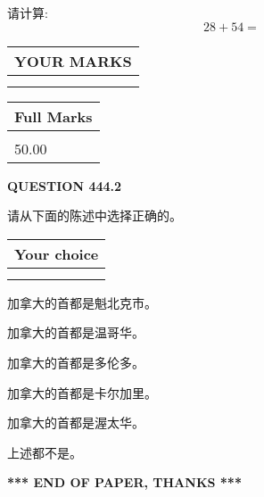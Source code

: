 \documentclass{ctexart}
\begin{document}
  
 
请计算:
\begin{equation}
28 +  %
54 = \nonumber
\end{equation}
 

 

 
  
\vspace{0.2in}
  
\noindent\begin{tabular}{|l|}
\hline
 YOUR MARKS  \\
\hline
 \\ 
 \\ 
\hline
\end{tabular}
\hspace{0.05in} \begin{tabular}{|l|}
\hline
 Full Marks  \\
\hline
 \\ 
50.00 \\
\hline
\end{tabular}
{\textbf{\Large{QUESTION
444.2 
}}}
  
  
请从下面的陈述中选择正确的。
  
  
\noindent\hspace{3.0in} \begin{tabular}{|l|}
\hline
Your choice \\
\hline
 \\ 
 \\ 
\hline
\end{tabular}
  
  
 
 
加拿大的首都是魁北克市。
 
 
加拿大的首都是温哥华。
 
 
加拿大的首都是多伦多。
 
 
加拿大的首都是卡尔加里。
 
 
加拿大的首都是渥太华。
 
 
 上述都不是。
 
 
   
   
 \vspace{0.2in}
 
   
   
   
   
\vspace{1.0in} 
{\textbf{\large{ *** END OF PAPER, THANKS *** }}} 
   
\end{document}

